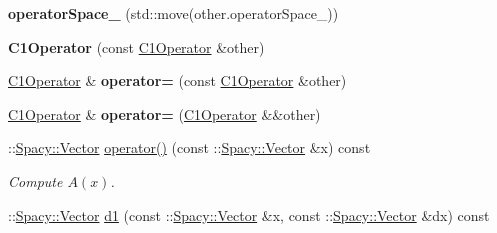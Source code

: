 \begin{DoxyCompactItemize}
\item 
\hypertarget{classSpacy_1_1FEniCS_1_1C1Operator_a852bcd48c30d3998ccacdf9d5db8d3d8}{{\bfseries operator\-Space\-\_\-} (std\-::move(other.\-operator\-Space\-\_\-))}\label{classSpacy_1_1FEniCS_1_1C1Operator_a852bcd48c30d3998ccacdf9d5db8d3d8}

\item 
\hypertarget{classSpacy_1_1FEniCS_1_1C1Operator_a8bedc9295f43ebe21be9e2a9337da1e5}{{\bfseries \-C1\-Operator} (const \hyperlink{classSpacy_1_1FEniCS_1_1C1Operator}{\-C1\-Operator} \&other)}\label{classSpacy_1_1FEniCS_1_1C1Operator_a8bedc9295f43ebe21be9e2a9337da1e5}

\item 
\hypertarget{classSpacy_1_1FEniCS_1_1C1Operator_a1e74d332b9cb30ed83d757a39453c47c}{\hyperlink{classSpacy_1_1FEniCS_1_1C1Operator}{\-C1\-Operator} \& {\bfseries operator=} (const \hyperlink{classSpacy_1_1FEniCS_1_1C1Operator}{\-C1\-Operator} \&other)}\label{classSpacy_1_1FEniCS_1_1C1Operator_a1e74d332b9cb30ed83d757a39453c47c}

\item 
\hypertarget{classSpacy_1_1FEniCS_1_1C1Operator_ae611721c1f172413877c91a3e99ae69b}{\hyperlink{classSpacy_1_1FEniCS_1_1C1Operator}{\-C1\-Operator} \& {\bfseries operator=} (\hyperlink{classSpacy_1_1FEniCS_1_1C1Operator}{\-C1\-Operator} \&\&other)}\label{classSpacy_1_1FEniCS_1_1C1Operator_ae611721c1f172413877c91a3e99ae69b}

\item 
\hypertarget{classSpacy_1_1FEniCS_1_1C1Operator_a5e2b3831a7583793f6c134eedd2be9bc}{\-::\hyperlink{classSpacy_1_1Vector}{\-Spacy\-::\-Vector} \hyperlink{classSpacy_1_1FEniCS_1_1C1Operator_a5e2b3831a7583793f6c134eedd2be9bc}{operator()} (const \-::\hyperlink{classSpacy_1_1Vector}{\-Spacy\-::\-Vector} \&x) const }\label{classSpacy_1_1FEniCS_1_1C1Operator_a5e2b3831a7583793f6c134eedd2be9bc}

\begin{DoxyCompactList}\small\item\em \-Compute $A(x)$. \end{DoxyCompactList}\item 
\hypertarget{classSpacy_1_1FEniCS_1_1C1Operator_a610d7a4a5daec3b512ab3ccf46a7b9e9}{\-::\hyperlink{classSpacy_1_1Vector}{\-Spacy\-::\-Vector} \hyperlink{classSpacy_1_1FEniCS_1_1C1Operator_a610d7a4a5daec3b512ab3ccf46a7b9e9}{d1} (const \-::\hyperlink{classSpacy_1_1Vector}{\-Spacy\-::\-Vector} \&x, const \-::\hyperlink{classSpacy_1_1Vector}{\-Spacy\-::\-Vector} \&dx) const }\label{classSpacy_1_1FEniCS_1_1C1Operator_a610d7a4a5daec3b512ab3ccf46a7b9e9}


\end{DoxyCompactItemize}
